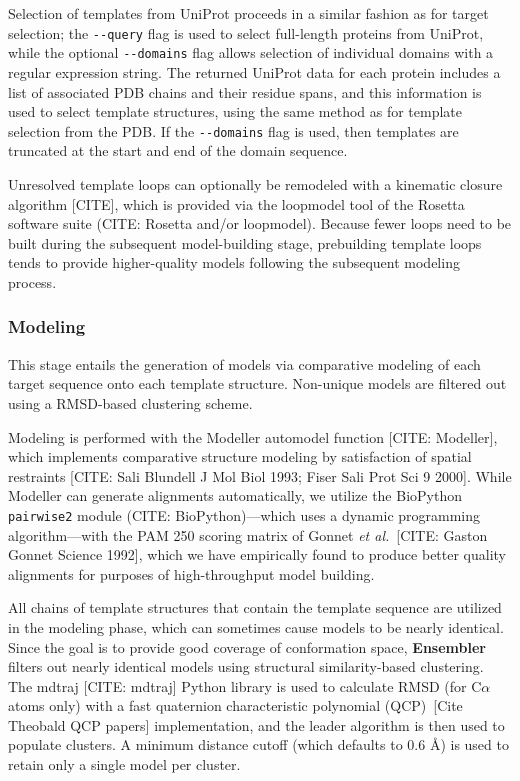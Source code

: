 \documentclass[aps,pre,twocolumn,nofootinbib,superscriptaddress,linenumbers]{revtex4-1}
\begin{document}
Selection of templates from UniProt proceeds in a similar fashion as for target selection; the {\tt -{}-query} flag is used to select full-length proteins from UniProt, while the optional {\tt -{}-domains} flag allows selection of individual domains with a regular expression string.
The returned UniProt data for each protein includes a list of associated PDB chains and their residue spans, and this information is used to select template structures, using the same method as for template selection from the PDB.
If the {\tt -{}-domains} flag is used, then templates are truncated at the start and end of the domain sequence.

Unresolved template loops can optionally be remodeled with a kinematic closure algorithm {\color{red}[CITE]}, which is provided via the loopmodel tool of the Rosetta software suite (CITE: Rosetta and/or loopmodel).
Because fewer loops need to be built during the subsequent model-building stage, prebuilding template loops tends to provide higher-quality models following the subsequent modeling process.

\subsubsection{Modeling}

This stage entails the generation of models via comparative modeling of each target sequence onto each template structure. Non-unique models are filtered out using a RMSD-based clustering scheme.

Modeling is performed with the Modeller automodel function {\color{red}[CITE: Modeller]}, which implements comparative structure modeling by satisfaction of spatial restraints {\color{red}[CITE: Sali Blundell J Mol Biol 1993; Fiser Sali Prot Sci 9 2000]}.
While Modeller can generate alignments automatically, we utilize the BioPython {\tt pairwise2} module (CITE: BioPython)---which uses a dynamic programming algorithm---with the PAM 250 scoring matrix of Gonnet \textit{et al.}~{\color{red}[CITE: Gaston Gonnet Science 1992]}, which we have empirically found to produce better quality alignments for purposes of high-throughput model building.

All chains of template structures that contain the template sequence are utilized in the modeling phase, which can sometimes cause models to be nearly identical.
Since the goal is to provide good coverage of conformation space, {\bf Ensembler} filters out nearly identical models using structural similarity-based clustering.
The mdtraj {\color{red}[CITE: mdtraj]} Python library is used to calculate RMSD (for C$\alpha$ atoms only) with a fast quaternion characteristic polynomial (QCP)~{\color{red}[Cite Theobald QCP papers]} implementation, and the leader algorithm is then used to populate clusters.
A minimum distance cutoff (which defaults to 0.6 \AA) is used to retain only a single model per cluster.
\end{document}
